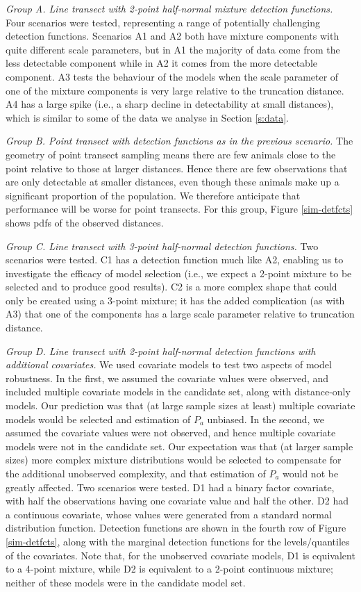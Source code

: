 \documentclass[useAMS,referee,usenatbib]{biom}
\begin{document}
\textit{Group A. Line transect with 2-point half-normal mixture detection functions.} Four scenarios were tested, representing a range of potentially challenging detection functions.  Scenarios A1 and A2 both have mixture components with quite different scale parameters, but in A1 the majority of data come from the less detectable component while in A2 it comes from the more detectable component.  A3 tests the behaviour of the models when the scale parameter of one of the mixture components is very large relative to the truncation distance. A4 has a large spike (i.e., a sharp decline in detectability at small distances), which is similar to some of the data we analyse in Section \ref{s:data}.

\textit{Group B. Point transect with detection functions as in the previous scenario.} The geometry of point transect sampling means there are few animals close to the point relative to those at larger distances. Hence there are few observations that are only detectable at smaller distances, even though these animals make up a significant proportion of the population. We therefore anticipate that performance will be worse for point transects. For this group, Figure \ref{sim-detfcts} shows pdfs of the observed distances.

\textit{Group C. Line transect with 3-point half-normal detection functions.} Two scenarios were tested. C1 has a detection function much like A2, enabling us to investigate the efficacy of model selection (i.e., we expect a 2-point mixture to be selected and to produce good results). C2 is a more complex shape that could only be created using a 3-point mixture; it has the added complication (as with A3) that one of the components has a large scale parameter relative to truncation distance.

\textit{Group D. Line transect with 2-point half-normal detection functions with additional covariates.}  We used covariate models to test two aspects of model robustness. In the first, we assumed the covariate values were observed, and included multiple covariate models in the candidate set, along with distance-only models. Our prediction was that (at large sample sizes at least) multiple covariate models would be selected and estimation of $P_a$ unbiased.  In the second, we assumed the covariate values were not observed, and hence multiple covariate models were not in the candidate set.  Our expectation was that (at larger sample sizes) more complex mixture distributions would be selected to compensate for the additional unobserved complexity, and that estimation of $P_a$ would not be greatly affected.  Two scenarios were tested.  D1 had a binary factor covariate, with half the observations having one covariate value and half the other.  D2 had a continuous covariate, whose values were generated from a standard normal distribution function.  Detection functions are shown in the fourth row of Figure \ref{sim-detfcts}, along with the marginal detection functions for the levels/quantiles of the covariates. Note that, for the unobserved covariate models, D1 is equivalent to a 4-point mixture, while D2 is equivalent to a 2-point continuous mixture; neither of these models were in the candidate model set.  
\end{document}
